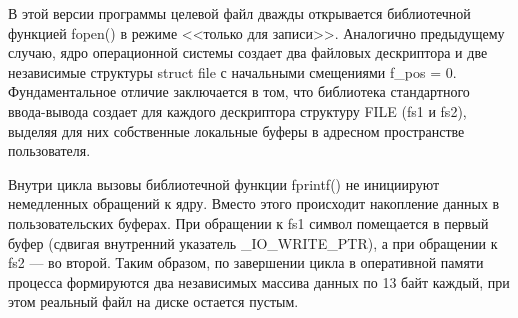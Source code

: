 





В этой версии программы целевой файл дважды открывается библиотечной функцией 
fopen() в режиме <<только для записи>>. Аналогично предыдущему случаю, ядро 
операционной системы создает два файловых дескриптора и две независимые структуры 
struct file с начальными смещениями f\_pos = 0. Фундаментальное отличие заключается 
в том, что библиотека стандартного ввода-вывода создает для каждого дескриптора 
структуру FILE (fs1 и fs2), выделяя для них собственные локальные буферы в адресном 
пространстве пользователя.

Внутри цикла вызовы библиотечной функции fprintf() не инициируют немедленных обращений 
к ядру. Вместо этого происходит накопление данных в пользовательских буферах. При 
обращении к fs1 символ помещается в первый буфер (сдвигая внутренний указатель 
\_IO\_WRITE\_PTR), а при обращении к fs2 --- во второй. Таким образом, по завершении 
цикла в оперативной памяти процесса формируются два независимых массива данных по 
13 байт каждый, при этом реальный файл на диске остается пустым.

